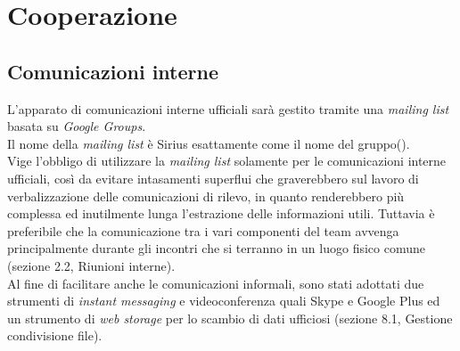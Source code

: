 \section{Cooperazione}
\subsection{Comunicazioni interne}
L'apparato di comunicazioni interne ufficiali sarà gestito tramite una \textit{mailing list} basata su \textit{Google Groups}.\\
Il nome della \textit{mailing list} è Sirius esattamente come il nome del gruppo(\gruppo).\\ Vige l'obbligo di utilizzare la \textit{mailing list} solamente per le comunicazioni interne ufficiali, così da evitare intasamenti superflui che graverebbero sul lavoro di verbalizzazione delle comunicazioni di rilevo, in quanto renderebbero più complessa ed inutilmente lunga l'estrazione delle informazioni utili. Tuttavia è preferibile che la comunicazione tra i vari componenti del team avvenga principalmente durante gli incontri che si terranno in un luogo fisico comune (sezione 2.2, Riunioni interne).\\
Al fine di facilitare anche le comunicazioni informali, sono stati adottati due strumenti di \textit{instant messaging} e videoconferenza quali Skype e Google Plus ed un strumento di \textit{web storage} per lo scambio di dati ufficiosi (sezione 8.1, Gestione condivisione file).

